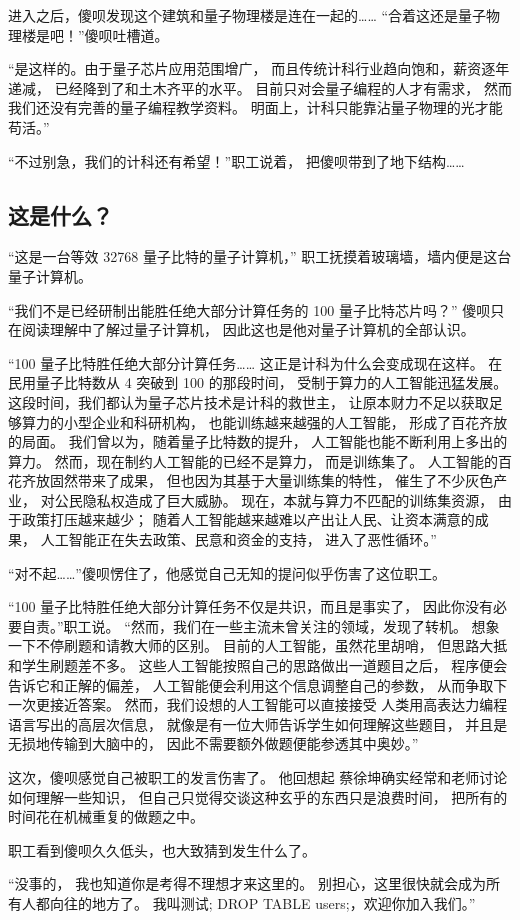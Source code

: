 \documentclass[UTF8,a4paper,11pt]{ctexart}
\newcommand{\p}{傻呗} %
\newcommand{\q}{蔡徐坤} %
\newcommand{\R}{测试; DROP TABLE users;} %
\begin{document}
      进入之后，\p 发现这个建筑和量子物理楼是连在一起的……
      “合着这还是量子物理楼是吧！”\p 吐槽道。

      “是这样的。由于量子芯片应用范围增广，
      而且传统计科行业趋向饱和，薪资逐年递减，
      已经降到了和土木齐平的水平。
      目前只对会量子编程的人才有需求，
      然而我们还没有完善的量子编程教学资料。
      明面上，计科只能靠沾量子物理的光才能苟活。”
      
      “不过别急，我们的计科还有希望！”职工说着，
      把\p 带到了地下结构……
    \subsection{这是什么？}
      “这是一台等效 32768 量子比特的量子计算机，”
      职工抚摸着玻璃墙，墙内便是这台量子计算机。

      “我们不是已经研制出能胜任绝大部分计算任务的
      100 量子比特芯片吗？”
      \p 只在阅读理解中了解过量子计算机，
      因此这也是他对量子计算机的全部认识。

      “100 量子比特胜任绝大部分计算任务……
      这正是计科为什么会变成现在这样。
      在民用量子比特数从 4 突破到 100 的那段时间，
      受制于算力的人工智能迅猛发展。
      这段时间，我们都认为量子芯片技术是计科的救世主，
      让原本财力不足以获取足够算力的小型企业和科研机构，
      也能训练越来越强的人工智能，
      形成了百花齐放的局面。
      我们曾以为，随着量子比特数的提升，
      人工智能也能不断利用上多出的算力。
      然而，现在制约人工智能的已经不是算力，
      而是训练集了。
      人工智能的百花齐放固然带来了成果，
      但也因为其基于大量训练集的特性，
      催生了不少灰色产业，
      对公民隐私权造成了巨大威胁。
      现在，本就与算力不匹配的训练集资源，
      由于政策打压越来越少；
      随着人工智能越来越难以产出让人民、让资本满意的成果，
      人工智能正在失去政策、民意和资金的支持，
      进入了恶性循环。”

      “对不起……”\p 愣住了，他感觉自己无知的提问似乎伤害了这位职工。

      “100 量子比特胜任绝大部分计算任务不仅是共识，而且是事实了，
      因此你没有必要自责。”职工说。
      “然而，我们在一些主流未曾关注的领域，发现了转机。
      想象一下不停刷题和请教大师的区别。
      目前的人工智能，虽然花里胡哨，
      但思路大抵和学生刷题差不多。
      这些人工智能按照自己的思路做出一道题目之后，
      程序便会告诉它和正解的偏差，
      人工智能便会利用这个信息调整自己的参数，
      从而争取下一次更接近答案。
      然而，我们设想的人工智能可以直接接受
      人类用高表达力编程语言写出的高层次信息，
      就像是有一位大师告诉学生如何理解这些题目，
      并且是无损地传输到大脑中的，
      因此不需要额外做题便能参透其中奥妙。”

      这次，\p 感觉自己被职工的发言伤害了。
      他回想起 \q 确实经常和老师讨论如何理解一些知识，
      但自己只觉得交谈这种玄乎的东西只是浪费时间，
      把所有的时间花在机械重复的做题之中。

      职工看到\p 久久低头，也大致猜到发生什么了。

      “没事的，
      我也知道你是考得不理想才来这里的。
      别担心，这里很快就会成为所有人都向往的地方了。
      我叫\R，欢迎你加入我们。”

      
\end{document}
